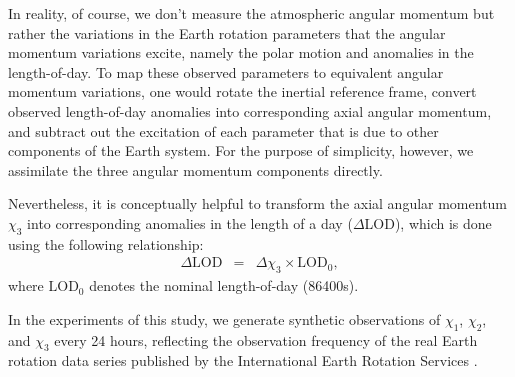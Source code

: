 In reality, of course, we don't measure the atmospheric angular momentum but rather the variations in the Earth rotation parameters that the angular momentum variations excite, namely the polar motion and anomalies in the length-of-day. 
To map these observed parameters to equivalent angular momentum variations, one would rotate the inertial reference frame, convert observed length-of-day anomalies into corresponding axial angular momentum, and subtract out the excitation of each parameter that is due to other components of the Earth system.
For the purpose of simplicity, however, we assimilate the three angular momentum components directly.

Nevertheless, it is conceptually helpful to transform the axial angular momentum $\chi_3$ into corresponding anomalies in the length of a day ($\Delta$LOD), which is done using the following relationship:
\begin{eqnarray}
\Delta \text{LOD} &=& \Delta \chi_3 \times \text{LOD}_0 ,
\label{eq:X3_to_LOD}
\end{eqnarray}
where $\text{LOD}_0$ denotes the nominal length-of-day (86400s).  

In the experiments of this study, we generate synthetic observations of $\chi_1$, $\chi_2$, and $\chi_3$ every 24 hours, reflecting the observation frequency of the real Earth rotation data series published by the International Earth Rotation Services \citep{iers}.  



